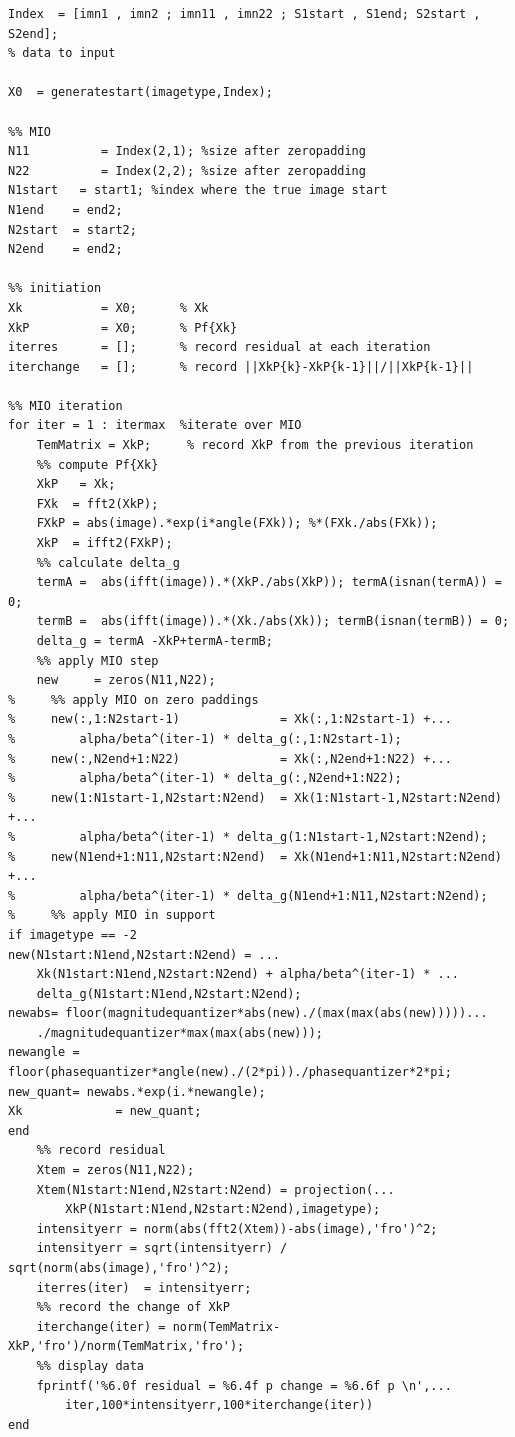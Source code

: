 \documentclass[letter,14pt]{extreport}
\begin{document}
\begin{appendices}
\begin{lstlisting}
Index  = [imn1 , imn2 ; imn11 , imn22 ; S1start , S1end; S2start , S2end];
% data to input

X0  = generatestart(imagetype,Index);

%% MIO  
N11          = Index(2,1); %size after zeropadding
N22          = Index(2,2); %size after zeropadding
N1start   = start1; %index where the true image start
N1end    = end2;
N2start  = start2;
N2end    = end2;

%% initiation
Xk           = X0;      % Xk
XkP          = X0;      % Pf{Xk}
iterres      = [];      % record residual at each iteration
iterchange   = [];      % record ||XkP{k}-XkP{k-1}||/||XkP{k-1}||

%% MIO iteration
for iter = 1 : itermax  %iterate over MIO
    TemMatrix = XkP;     % record XkP from the previous iteration
    %% compute Pf{Xk}
    XkP   = Xk;
    FXk  = fft2(XkP);
    FXkP = abs(image).*exp(i*angle(FXk)); %*(FXk./abs(FXk));
    XkP  = ifft2(FXkP);
    %% calculate delta_g
    termA =  abs(ifft(image)).*(XkP./abs(XkP)); termA(isnan(termA)) = 0;
    termB =  abs(ifft(image)).*(Xk./abs(Xk)); termB(isnan(termB)) = 0;
    delta_g = termA -XkP+termA-termB;
    %% apply MIO step
    new     = zeros(N11,N22);
%     %% apply MIO on zero paddings
%     new(:,1:N2start-1)              = Xk(:,1:N2start-1) +...
%         alpha/beta^(iter-1) * delta_g(:,1:N2start-1);
%     new(:,N2end+1:N22)              = Xk(:,N2end+1:N22) +...
%         alpha/beta^(iter-1) * delta_g(:,N2end+1:N22);
%     new(1:N1start-1,N2start:N2end)  = Xk(1:N1start-1,N2start:N2end) +...
%         alpha/beta^(iter-1) * delta_g(1:N1start-1,N2start:N2end);
%     new(N1end+1:N11,N2start:N2end)  = Xk(N1end+1:N11,N2start:N2end) +...
%         alpha/beta^(iter-1) * delta_g(N1end+1:N11,N2start:N2end);
%     %% apply MIO in support
if imagetype == -2
new(N1start:N1end,N2start:N2end) = ...
    Xk(N1start:N1end,N2start:N2end) + alpha/beta^(iter-1) * ...
    delta_g(N1start:N1end,N2start:N2end);
newabs= floor(magnitudequantizer*abs(new)./(max(max(abs(new)))))...
    ./magnitudequantizer*max(max(abs(new)));
newangle = floor(phasequantizer*angle(new)./(2*pi))./phasequantizer*2*pi;
new_quant= newabs.*exp(i.*newangle);
Xk             = new_quant;
end
    %% record residual
    Xtem = zeros(N11,N22);
    Xtem(N1start:N1end,N2start:N2end) = projection(...
        XkP(N1start:N1end,N2start:N2end),imagetype);
    intensityerr = norm(abs(fft2(Xtem))-abs(image),'fro')^2;
    intensityerr = sqrt(intensityerr) / sqrt(norm(abs(image),'fro')^2);
    iterres(iter)  = intensityerr;
    %% record the change of XkP
    iterchange(iter) = norm(TemMatrix-XkP,'fro')/norm(TemMatrix,'fro');
    %% display data
    fprintf('%6.0f residual = %6.4f p change = %6.6f p \n',...
        iter,100*intensityerr,100*iterchange(iter))
end


\end{lstlisting}
\end{appendices}
\end{document}
